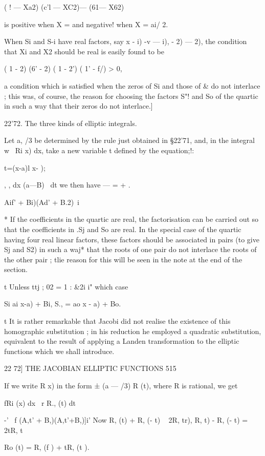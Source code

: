 ( ! — Xa2) (c'l — XC2)— (61— X62)

is positive when X = and negative! when X = ai/ 2.

When Si and S-i have real factors, say x - i) -v — i), - 2) — 2), the
condition that Xi and X2 should be real is easily found to be

( 1 - 2) (6' - 2) ( 1 - 2') ( 1' - f/) > 0,

a condition which is satisfied when the zeros of Si and those of \& do
not interlace ; this was, of course, the reason for choosing the
factors S"! and So of the quartic in such a way that their zeros do
not interlace.]

22'72. The three kinds of elliptic integrals.

Let a, /3 be determined by the rule just obtained in §22'71, and, in
the integral w~ Ri x) dx, take a new variable t defined by the
equation;!:

t=(x-a)l x- );

 , , dx (a—B)~ dt we then have — = + .

    Aif' + Bi)(Ad' + B.2)\ i

* If the coefficients in the quartic are real, the factorisation can
be carried out so that the coefficients in .Sj and So are real. In the
special case of the quartic having four real linear factors, these
factors should be associated in pairs (to give Sj and S2) in such a
waj* that the roots of one pair do not interlace the roots of the
other pair ; tlie reason for this will be seen in the note at the end
of the section.

t Unless ttj ; 02 = 1 : \&2i i" which case

Si ai x-a) + Bi, S., = ao x - a) + Bo.

t It is rather remarkable that Jacobi did not realise the existence of
this homographic substitution ; in his reduction he employed a
quadratic substitution, equivalent to the result of applying a Landen
transformation to the elliptic functions which we shall introduce.

22 72] THE JACOBIAN ELLIPTIC FUNCTIONS 515

If we write R x) in the form ± (a — /3) R (t), where R is rational, we
get

fRi (x) dx \ r R., (t) dt

-' ~f (A,t' + B,)(A,t'+B,)]i' Now R, (t) + R, (- t) ~ 2R, tr), R, t) -
R, (- t) = 2tR, t%

Ro (t) = R, (f ) + tR, (t ).


